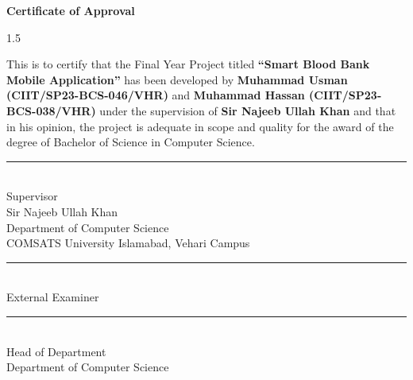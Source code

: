 

\newpage
\thispagestyle{empty}

\begin{center}
\textbf{\LARGE Certificate of Approval}
\end{center}

\vspace{1.5cm}

\begin{spacing}{1.5}

This is to certify that the Final Year Project titled 
\textbf{``Smart Blood Bank Mobile Application''}
has been developed by \textbf{Muhammad Usman (CIIT/SP23-BCS-046/VHR)} and \textbf{Muhammad Hassan (CIIT/SP23-BCS-038/VHR)} under the supervision of \textbf{Sir Najeeb Ullah Khan} and that in his opinion, the project is adequate in scope and quality for the award of the degree of Bachelor of Science in Computer Science.

\end{spacing}

\vspace{2.5cm}
\noindent\rule{6cm}{0.4pt}  
\\ 
Supervisor
\\
Sir Najeeb Ullah Khan
\\
Department of Computer Science
\\
COMSATS University Islamabad, Vehari Campus

\vspace{2.5cm}
\noindent\rule{6cm}{0.4pt}  
\\ 
External Examiner

\vspace{2.5cm}

\noindent\rule{6cm}{0.4pt}  
\\ 
Head of Department  
\\ 
Department of Computer Science

\newpage
